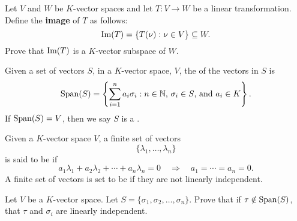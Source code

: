 \documentclass{ximera}
\begin{document}
\begin{exercise}
  Let $V$ and $W$ be $K$-vector spaces and let $T:V\to W$ be a linear
  transformation. Define the \textbf{image} of $T$ as follows:
  \[
  \operatorname{Im}(T) = \{T(\nu): \nu\in V\}\subseteq W.
  \]
  Prove that $\operatorname{Im}(T)$ is a $K$-vector subspace of $W$.
\end{exercise}







\begin{definition}
  Given a set of vectors $S$, in a $K$-vector space, $V$, the
   of the vectors in $S$ is
  \[
  \operatorname{Span}(S) = \left\{\sum_{i=1}^n a_i\sigma_i:\text{$n\in \mathbb N$,
    $\sigma_i\in S$, and $a_i\in K$}\right\}.
  \]
  If $\operatorname{Span}(S) = V$, then we say $S$ is a .
\end{definition}





\begin{definition}
  Given a $K$-vector space $V$, a finite set of vectors
  \[
  \{\lambda_1,\dots,\lambda_n\}
  \]
  is said to be  if
  \[
  a_1\lambda_1 + a_2\lambda_2 +\cdots + a_n\lambda_n = 0\quad \Rightarrow \quad a_1= \cdots =a_n = 0.
  \]
  A finite set of vectors is set to be  if
  they are not linearly independent.
\end{definition}



\begin{exercise}
  Let $V$ be a $K$-vector space. Let $S= \{\sigma_1,\sigma_2,
  \dots,\sigma_n\}$. Prove that if $\tau\notin\operatorname{Span}(S)$, that $\tau$
  and $\sigma_i$ are linearly independent.
\end{exercise}


\end{document}
